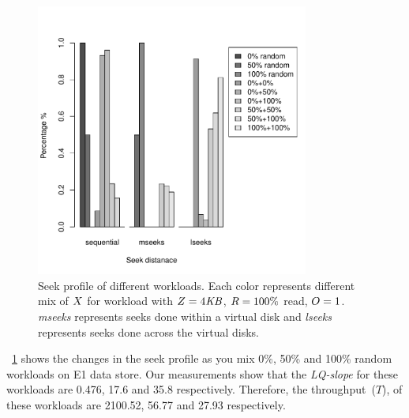 \begin{figure}[!t]
\centering
\includegraphics[width=0.8\textwidth]{figure/seek_profile.pdf}
\captionsetup{format=myformat}
\caption{Seek profile of different workloads.
Each color represents different mix of $X$ for workload with $Z=4\mathit{KB}$, $R=100\%$ read, $O=1$.
\emph{mseeks} represents seeks done within a virtual disk and \emph{lseeks} represents seeks done across the virtual disks.}
\label{seekpr}
\end{figure}
\figurename~\ref{seekpr} shows the changes in the seek profile as you mix 0\%, 50\% and 100\% random workloads on E1 data store.
Our measurements show that the \emph{LQ-slope} for these workloads are 0.476, 17.6 and 35.8 respectively.
Therefore, the throughput~($T$), of these workloads are 2100.52, 56.77 and 27.93 respectively.

